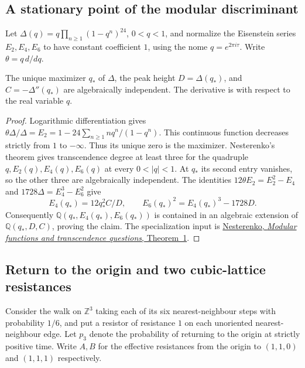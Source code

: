 \documentclass[11pt,a4paper]{article}
\theoremstyle{definition}\newtheorem{definition}[theorem]{Definition}\newtheorem{example}[theorem]{Example}
\theoremstyle{remark}\newtheorem{remark}[theorem]{Remark}
\newcommand{\Q}{\mathbb Q}\newcommand{\Z}{\mathbb Z}\newcommand{\R}{\mathbb R}\newcommand{\N}{\mathbb N}
\begin{document}
\subsection{A stationary point of the modular discriminant}
Let $\Delta(q)=q\prod_{n\ge1}(1-q^n)^{24}$, $0<q<1$, and normalize the
Eisenstein series $E_2,E_4,E_6$ to have constant coefficient $1$, using the
nome $q=e^{2\pi i\tau}$. Write $\theta=q\,d/dq$.
\begin{proposition}\label{prop:peak-triple}
The unique maximizer $q_*$ of $\Delta$, the peak height $D=\Delta(q_*)$,
and $C=-\Delta''(q_*)$ are algebraically independent. The derivative is
with respect to the real variable $q$.
\end{proposition}
\begin{proof}
Logarithmic differentiation gives
$\theta\Delta/\Delta=E_2=1-24\sum_{n\ge1}n q^n/(1-q^n)$.
This continuous function decreases strictly from $1$ to $-\infty$. Thus its
unique zero is the maximizer. Nesterenko's theorem gives transcendence
degree at least three for the quadruple $q,E_2(q),E_4(q),E_6(q)$ at every
$0<|q|<1$. At $q_*$ its second entry vanishes, so the other three are
algebraically independent. The identities $12\theta E_2=E_2^2-E_4$ and
$1728\Delta=E_4^3-E_6^2$ give
\[
 E_4(q_*)=12q_*^2 C/D,\qquad E_6(q_*)^2=E_4(q_*)^3-1728D.
\]
Consequently $\Q(q_*,E_4(q_*),E_6(q_*))$ is contained in an algebraic
extension of $\Q(q_*,D,C)$, proving the claim. The specialization input is
\href{https://doi.org/10.1070/SM1996v187n09ABEH000158}{Nesterenko,
\emph{Modular functions and transcendence questions}, Theorem~1}.
\end{proof}

\subsection{Return to the origin and two cubic-lattice resistances}
Consider the walk on $\Z^3$ taking each of its six nearest-neighbour steps
with probability $1/6$, and put a resistor of resistance $1$ on each
unoriented nearest-neighbour edge. Let $p_3$ denote the probability of
returning to the origin at strictly positive time. Write $A,B$ for the
effective resistances from the origin to $(1,1,0)$ and $(1,1,1)$ respectively.
\end{document}
